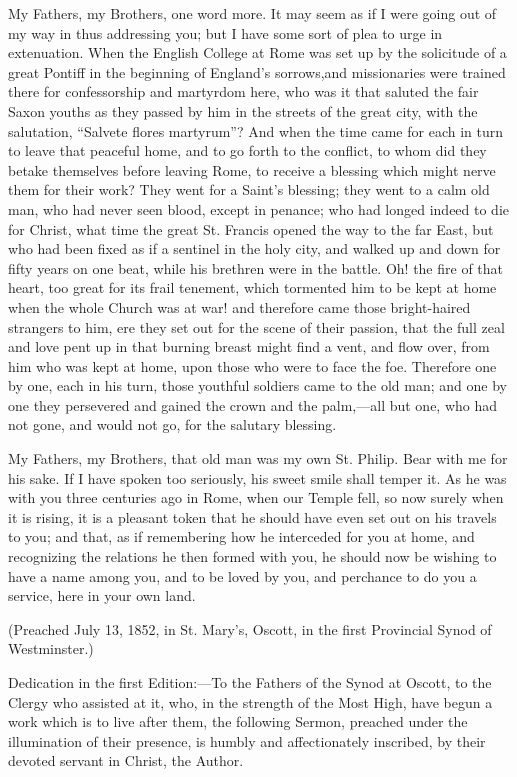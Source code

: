 My Fathers, my Brothers, one word more. It may seem as
if I were going out of my way in thus addressing you; but
I have some sort of plea to urge in extenuation. When the
English College at Rome was set up by the solicitude of a
great Pontiff in the beginning of England's sorrows,\textbf{}and
missionaries were trained there for confessorship and
martyrdom here, who was it that saluted the fair Saxon
youths as they passed by him in the streets of the great
city, with the salutation, ``Salvete flores
martyrum''? And when the time came for each in turn
to leave that peaceful home, and to go forth to the
conflict, to whom did they betake themselves before
leaving Rome, to receive a blessing which might nerve
them for their work? They went for a Saint's blessing;
they went to a calm old man, who had never seen blood,
except in penance; who had longed indeed to die for
Christ, what time the great St. Francis opened the way to
the far East, but who had been fixed as if a sentinel in
the holy city, and walked up and down for fifty years on
one beat, while his brethren were in the battle. Oh! the
fire of that heart, too great for its frail tenement,
which tormented him to be kept at home when the whole
Church was at war! and therefore came those bright-haired
strangers to him, ere they set out for the scene of their
passion, that the full zeal and love pent up in that
burning breast might find a vent, and flow over, from him
who was kept at home, upon those who were to face the
foe. Therefore one by one, each in his turn, those
youthful soldiers came to the old man; and one by one
they persevered and gained the crown and the
palm,—all but one, who had not gone, and would not
go, for the salutary blessing.

My Fathers, my Brothers, that old man was my own St.
Philip. Bear with me for his sake. If I have spoken too
seriously, his sweet smile shall temper it. As he was
with you three centuries ago in Rome, when our Temple
fell, so now surely when it is rising, it is a pleasant
token that he should have even set out on his travels to
you; and that, as if remembering how he interceded for
you at home, and recognizing the relations he then formed
with you, he should now be wishing to have a name among
you, and to be loved by you, and perchance to do you a
service, here in your own land.

(Preached July 13, 1852, in St. Mary's, Oscott, in the
first Provincial Synod of Westminster.)


Dedication in the first Edition:—To
the Fathers of the Synod at Oscott, to the Clergy who
assisted at it, who, in the strength of the Most High,
have begun a work which is to live after them, the
following Sermon, preached under the illumination of
their presence, is humbly and affectionately inscribed,
by their devoted servant in Christ, the Author.

